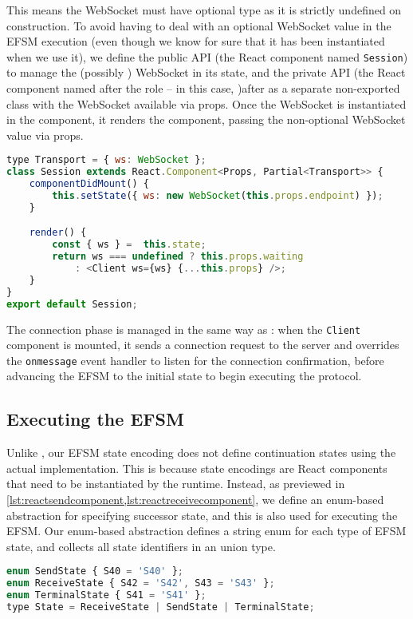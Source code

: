 This means the WebSocket must have optional type as it is 
strictly undefined on construction.
To avoid having to deal with an optional WebSocket value
in the EFSM execution (even though we know for sure that it
has been instantiated when we use it),
we define the public API (the React component named 
\texttt{Session}) to manage the (possibly )
WebSocket in its state, and the private API (the React component
named after the role -- in this case, )after
as a separate non-exported class
with the WebSocket available via props. Once the WebSocket
is instantiated in the  component, it renders the
 component, passing the non-optional WebSocket value via props.

\begin{lstlisting}[language=javascript,tabsize=2]
type Transport = { ws: WebSocket };
class Session extends React.Component<Props, Partial<Transport>> {
	componentDidMount() {
		this.setState({ ws: new WebSocket(this.props.endpoint) });
	}

	render() {
		const { ws } = 	this.state;
		return ws === undefined ? this.props.waiting 
			: <Client ws={ws} {...this.props} />;
	}
}	
export default Session;
\end{lstlisting}

The connection phase is managed in the same way as :
when the \texttt{Client} component is mounted,
it sends a connection request to the server and overrides the
\texttt{onmessage} event handler to listen for the connection confirmation,
before advancing the EFSM to the initial state to begin executing the protocol.

\subsection{Executing the EFSM}
Unlike , our EFSM state encoding does not define
continuation states using the actual implementation.
This is because state encodings are React components
that need to be instantiated by the runtime.
Instead, as previewed in \cref{lst:reactsendcomponent,lst:reactreceivecomponent},
we define an enum-based abstraction for specifying
successor state, and this is also used for executing the EFSM.
Our enum-based abstraction defines a string enum for each type of EFSM state,
and collects all state identifiers in an union type.

\begin{lstlisting}[language=javascript,numbers=none]
enum SendState { S40 = 'S40' };
enum ReceiveState { S42 = 'S42', S43 = 'S43' };
enum TerminalState { S41 = 'S41' };
type State = ReceiveState | SendState | TerminalState;
\end{lstlisting}

